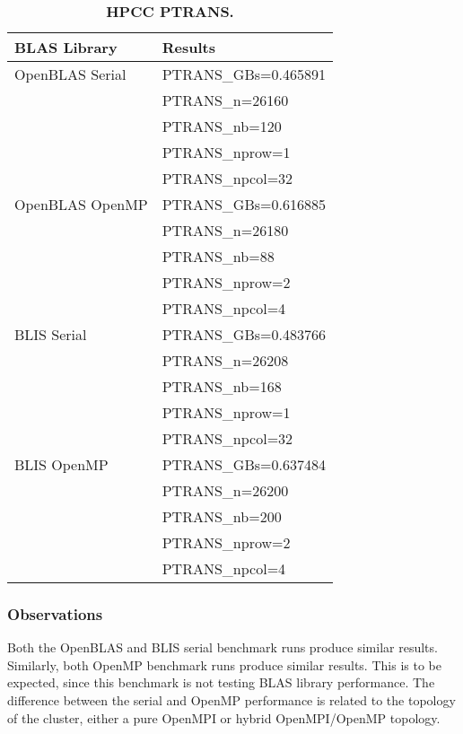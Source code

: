 \begin{table}[]
\begin{center}
\begin{tabular}{ |l|l| } 
\hline
\textbf{BLAS Library} & \textbf{Results} \\
\hline
OpenBLAS Serial & PTRANS\_GBs=0.465891 \\
                & PTRANS\_n=26160 \\ 
                & PTRANS\_nb=120 \\
                & PTRANS\_nprow=1 \\
                & PTRANS\_npcol=32 \\
\hline
OpenBLAS OpenMP & PTRANS\_GBs=0.616885 \\
                & PTRANS\_n=26180 \\
                & PTRANS\_nb=88 \\
                & PTRANS\_nprow=2 \\
                & PTRANS\_npcol=4 \\
\hline
BLIS Serial     & PTRANS\_GBs=0.483766 \\
                & PTRANS\_n=26208 \\
                & PTRANS\_nb=168 \\
                & PTRANS\_nprow=1 \\
                & PTRANS\_npcol=32 \\
\hline
BLIS OpenMP     & PTRANS\_GBs=0.637484 \\
                & PTRANS\_n=26200 \\
                & PTRANS\_nb=200 \\
                & PTRANS\_nprow=2 \\
                & PTRANS\_npcol=4 \\
\hline
\end{tabular}
\end{center}
\caption{\label{tab:table-name}\textbf{HPCC PTRANS.}}
\end{table}


\subsubsection{Observations}

Both the OpenBLAS and BLIS serial benchmark runs produce similar results. Similarly, both OpenMP benchmark runs produce similar results. This is to be expected, since this benchmark is not testing BLAS library performance. The difference between the serial and OpenMP performance is related to the topology of the cluster, either a pure OpenMPI or hybrid OpenMPI/OpenMP topology.

